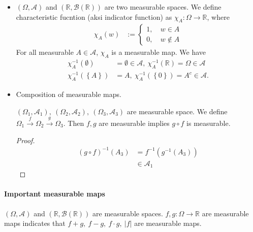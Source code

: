 \documentclass[../../note.tex]{subfiles}
\begin{document}
\begin{example}
    \begin{itemize}
        \item $(\Omega, \mathcal{A})$ and $(\mathbb{R}, \mathcal{B}(\mathbb{R}))$ are two measurable spaces. We define characteristic fucntion (aksi indicator function) as $\chi_{A}:\Omega \rightarrow \mathbb{R}$, where
        \begin{align}
            \chi_{A}(w)
            &:= \left\{
                \begin{matrix}
                    1,~& w \in A \\
                    0,~& w \notin A
                \end{matrix}
            \right.
        \end{align}
        For all measurable $A \in \mathcal{A}$, $\chi_A$ is a measurable map. We have
        \begin{align}
            \chi_A^{-1}(\emptyset) 
            &= \emptyset \in \mathcal{A},~ \chi_A^{-1}(\mathbb{R}) = \Omega \in \mathcal{A} \\
            \chi_A^{-1}(\left\{A\right\}) 
            &= A,~ \chi_A^{-1}(\left\{0\right\}) = A^c \in \mathcal{A}.
        \end{align}
        \item Composition of measurable maps. 
        \begin{lemma}
            $(\Omega_1, \mathcal{A_1}),~(\Omega_2, \mathcal{A_2}),~(\Omega_3, \mathcal{A_3})$ are measurable space. We define $\Omega_1 \stackrel{f}{\rightarrow}\Omega_2 \stackrel{g}{\rightarrow} \Omega_3$. Then $f,g$ are measurable implies $g \circ f$ is measurable.
        \end{lemma}
        \begin{proof}
            \begin{align}
                (g \circ f)^{-1}(A_3)
                &= f^{-1}(g^{-1}(A_3)) \\
                &\in \mathcal{A}_1
            \end{align}
        \end{proof}
    \end{itemize}
\end{example}

\paragraph{Important measurable maps}
\begin{lemma}
    $(\Omega,\mathcal{A})$ and $(\mathbb{R}, \mathcal{B}(\mathbb{R}))$ are measurable spaces. $f,g: \Omega \rightarrow \mathbb{R}$ are measurable maps indicates that $f+g,~f-g,~f \cdot g,~\vert f \vert$ are measurable maps.
\end{lemma}
\end{document}
